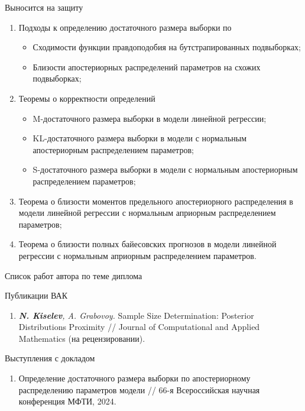 \documentclass[aspectratio=169]{beamer}
\begin{document}
\begin{frame}{Выносится на защиту}
    \begin{enumerate}
        \item Подходы к определению достаточного размера выборки по
        \begin{itemize}
            \item Сходимости функции правдоподобия на бутстрапированных подвыборках;
            \item Близости апостериорных распределений параметров на схожих подвыборках;
        \end{itemize}
        \item Теоремы о корректности определений
        \begin{itemize}
            \item M-достаточного размера выборки в модели линейной регрессии;
            \item KL-достаточного размера выборки в модели с нормальным апостериорным распределением параметров;
            \item S-достаточного размера выборки в модели с нормальным апостериорным распределением параметров;
        \end{itemize}
        \item Теорема о близости моментов предельного апостериорного распределения в модели линейной регрессии с нормальным априорным распределением параметров;
        \item Теорема о близости полных байесовских прогнозов в модели линейной регрессии с нормальным априорным распределением параметров.
    \end{enumerate}
\end{frame}

\begin{frame}{Список работ автора по теме диплома}
    \begin{block}{Публикации ВАК}
        \begin{enumerate}
            \item \textit{\textbf{N. Kiselev}, A. Grabovoy.} Sample Size Determination: Posterior Distributions Proximity // Journal of Computational and Applied Mathematics (на рецензировании).
        \end{enumerate}
    \end{block}
    \begin{block}{Выступления с докладом}
        \begin{enumerate}
            \item Определение достаточного размера выборки по апостериорному распределению параметров модели // 66-я Всероссийская научная конференция МФТИ, 2024.
        \end{enumerate}
    \end{block}
\end{frame}
\end{document}
